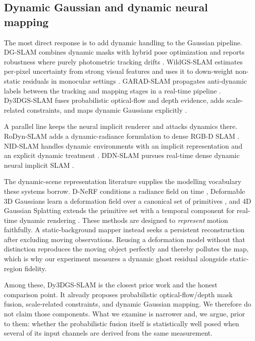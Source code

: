\documentclass[10pt,conference]{IEEEtran}
\begin{document}
\subsection{Dynamic Gaussian and dynamic neural mapping}
The most direct response is to add dynamic handling to the Gaussian pipeline. DG-SLAM combines dynamic masks with hybrid pose optimization and reports robustness where purely photometric tracking drifts \cite{xu2024dg}. WildGS-SLAM estimates per-pixel uncertainty from strong visual features and uses it to down-weight non-static residuals in monocular settings \cite{zheng2025wildgs}. GARAD-SLAM propagates anti-dynamic labels between the tracking and mapping stages in a real-time pipeline \cite{li2025garad}. Dy3DGS-SLAM fuses probabilistic optical-flow and depth evidence, adds scale-related constraints, and maps dynamic Gaussians explicitly \cite{li2025dy3dgs}.

A parallel line keeps the neural implicit renderer and attacks dynamics there. RoDyn-SLAM adds a dynamic-radiance formulation to dense RGB-D SLAM \cite{jiang2024rodynslam}. NID-SLAM handles dynamic environments with an implicit representation and an explicit dynamic treatment \cite{li2024nidslam}. DDN-SLAM pursues real-time dense dynamic neural implicit SLAM \cite{yuan2024ddnslam}.

The dynamic-scene representation literature supplies the modelling vocabulary these systems borrow. D-NeRF conditions a radiance field on time \cite{pumarola2021dnerf}, Deformable 3D Gaussians learn a deformation field over a canonical set of primitives \cite{yang2024deformable}, and 4D Gaussian Splatting extends the primitive set with a temporal component for real-time dynamic rendering \cite{wu20244dgs}. These methods are designed to \emph{represent} motion faithfully. A static-background mapper instead seeks a persistent reconstruction after excluding moving observations. Reusing a deformation model without that distinction reproduces the moving object perfectly and thereby pollutes the map, which is why our experiment measures a dynamic ghost residual alongside static-region fidelity.

Among these, Dy3DGS-SLAM is the closest prior work and the honest comparison point. It already proposes probabilistic optical-flow/depth mask fusion, scale-related constraints, and dynamic Gaussian mapping. We therefore do not claim those components. What we examine is narrower and, we argue, prior to them: whether the probabilistic fusion itself is statistically well posed when several of its input channels are derived from the same measurement.
\end{document}
